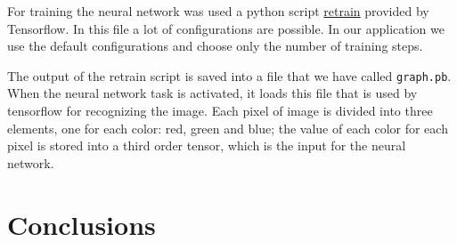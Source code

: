 \documentclass[12pt]{article}
\begin{document}
For training the neural network was used a python script
\href{https://www.tensorflow.org/hub/tutorials/image\_retraining}{retrain}
provided by Tensorflow. In this file a lot of configurations are possible. In
our application we use the default configurations and choose only the number
of training steps.

The output of the retrain script is saved into a file that we have called
\texttt{graph.pb}. When the neural network task is activated, it loads this
file that is used by tensorflow for recognizing the image. Each pixel of
image is divided into three elements, one for each color: red, green and
blue; the value of each color for each pixel is stored into a third order
tensor, which is the input for the neural network.

\section{Conclusions}
\end{document}
